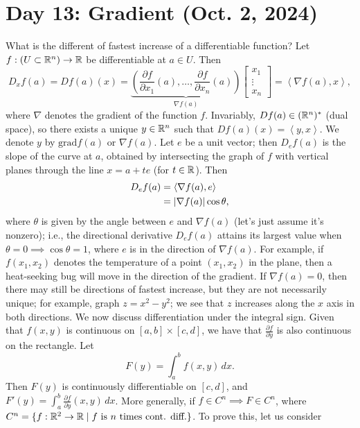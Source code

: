 \section{Day 13: Gradient (Oct. 2, 2024)}
What is the different of fastest increase of a differentiable function? Let $f : (U \subset \mathbb R^n) \to \mathbb R$ be differentiable at $a \in U$. Then
\[ D_x f(a) = D f(a)(x) = \underbrace{\left( \frac{\partial f}{\partial x_1} (a), \dots, \frac{\partial f}{\partial x_n}(a)\right)}_{\nabla f(a)} \begin{bmatrix} x_1 \\ \vdots \\ x_n \end{bmatrix} = \left< \nabla f(a), x \right>, \]
where $\nabla$ denotes the gradient of the function $f$. Invariably, $D f(a) \in (\mathbb R^n)^\ast$ (dual space), so there exists a unique $y \in \mathbb R^n$ such that $D f(a) (x) = \left<y, x\right>$. We denote $y$ by $\mathrm{grad} f(a)$ or $\nabla f(a)$. Let $e$ be a unit vector; then $D_e f(a)$ is the slope of the curve at $a$, obtained by intersecting the graph of $f$ with vertical planes through the line $x = a + te$ (for $t \in \mathbb R$). Then
\begin{align*}
    D_e f(a) &= \left< \nabla f(a), e \right> \\
    &= \left\lvert \nabla f(a) \right\rvert \cos \theta,
\end{align*}
where $\theta$ is given by the angle between $e$ and $\nabla f(a)$ (let's just assume it's nonzero); i.e., the directional derivative $D_e f(a)$ attains its largest value when $\theta = 0 \implies \cos \theta = 1$, where $e$ is in the direction of $\nabla f(a)$. For example, if $f(x_1, x_2)$ denotes the temperature of a point $(x_1, x_2)$ in the plane, then a heat-seeking bug will move in the direction of the gradient. If $\nabla f(a) = 0$, then there may still be directions of fastest increase, but they are not necessarily unique; for example, graph $z = x^2 - y^2$; we see that $z$ increases along the $x$ axis in both directions.
\medskip\newline
We now discuss differentiation under the integral sign. Given that $f(x, y)$ is continuous on $[a, b] \times [c, d]$, we have that $\frac{\partial f}{\partial y}$ is also continuous on the rectangle. Let
\[ F(y) = \int_a^b f(x, y) \, dx. \]
Then $F(y)$ is continuously differentiable on $[c, d]$, and $F'(y) = \int_a^b \frac{\partial f}{\partial y}(x, y) \, dx$. 
More generally, if $f \in C^n \implies F \in C^n$, where $C^n = \{f : \mathbb R^2 \to \mathbb R \mid f \text{ is } n \text{ times cont. diff.}\}$. To prove this, let us consider
